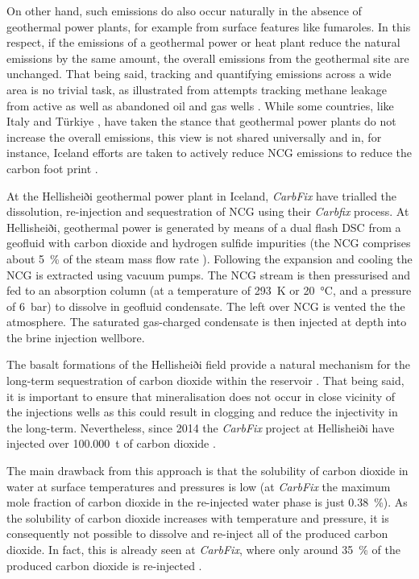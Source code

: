     On other hand, such emissions do also occur naturally in the absence of geothermal power plants, for example from surface features like fumaroles. In this respect, if the emissions of a geothermal power or heat plant reduce the natural emissions by the same amount, the overall emissions from the geothermal site are unchanged. That being said, tracking and quantifying emissions across a wide area is no trivial task, as illustrated from attempts tracking methane leakage from active as well as abandoned oil and gas wells \cite{Collins2022}. While some countries, like Italy \cite{Armannsson2003} and Türkiye \cite{Baba2022}, have taken the stance that geothermal power plants do not increase the overall emissions, this view is not shared universally and in, for instance, Iceland efforts are taken to actively reduce \ac{NCG} emissions to reduce the carbon foot print \cite{Sigfusson2018}.
    
    At the Hellisheiði geothermal power plant in Iceland, \emph{CarbFix} have trialled the dissolution, re-injection and sequestration of \ac{NCG} using their \emph{Carbfix} process\cite{CarbFix2024}. At Hellisheiði, geothermal power is generated by means of a dual flash \ac{DSC} from a geofluid with carbon dioxide and hydrogen sulfide impurities (the \ac{NCG} comprises about \qty{5}{\percent} of the steam mass flow rate \cite{Sigfusson2018}). Following the expansion and cooling the \ac{NCG} is extracted using vacuum pumps. The \ac{NCG} stream is then pressurised and fed to an absorption column (at a temperature of \qty{293}{\K} or \qty{20}{\degreeCelsius}, and a pressure of \qty{6}{\bar}) \cite{Gunnarsson2018} to dissolve in geofluid condensate. The left over \ac{NCG} is vented the the atmosphere. The saturated gas-charged condensate is then injected at depth into the brine injection wellbore. 

    The basalt formations of the Hellisheiði field provide a natural mechanism for the long-term sequestration of carbon dioxide within the reservoir \cite{CarbFix2024, Gunnarsson2018}. That being said, it is important to ensure that mineralisation does not occur in close vicinity of the injections wells as this could result in clogging and reduce the injectivity in the long-term. Nevertheless, since 2014 the \emph{CarbFix} project at Hellisheiði have injected over \qty{100,000}{\tonne} of carbon dioxide \cite{CarbFix2024}.

    The main drawback from this approach is that the solubility of carbon dioxide in water at surface temperatures and pressures is low (at \emph{CarbFix} the maximum mole fraction of carbon dioxide in the re-injected water phase is just \qty{0.38}{\percent}). As the solubility of carbon dioxide increases with temperature and pressure, it is consequently not possible to dissolve and re-inject all of the produced carbon dioxide. In fact, this is already seen at \emph{CarbFix}, where only around \qty{35}{\percent} of the produced carbon dioxide is re-injected \cite{Sigfusson2018}.

